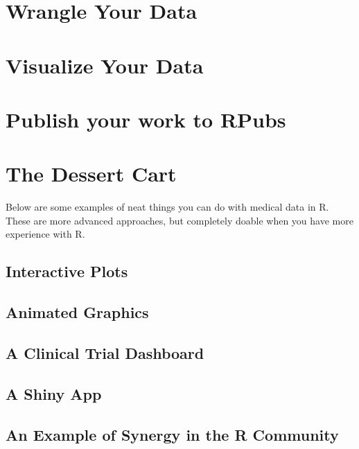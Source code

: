 \documentclass[]{book}
\begin{document}
\hypertarget{wrangle-your-data}{%
\section{Wrangle Your Data}\label{wrangle-your-data}}

\hypertarget{visualize-your-data}{%
\section{Visualize Your Data}\label{visualize-your-data}}

\hypertarget{publish-your-work-to-rpubs}{%
\section{Publish your work to RPubs}\label{publish-your-work-to-rpubs}}

\hypertarget{the-dessert-cart}{%
\section{The Dessert Cart}\label{the-dessert-cart}}

Below are some examples of neat things you can do with medical data in R. These are more advanced approaches, but completely doable when you have more experience with R.

\hypertarget{interactive-plots}{%
\subsection{Interactive Plots}\label{interactive-plots}}

\hypertarget{animated-graphics}{%
\subsection{Animated Graphics}\label{animated-graphics}}

\hypertarget{a-clinical-trial-dashboard}{%
\subsection{A Clinical Trial Dashboard}\label{a-clinical-trial-dashboard}}

\hypertarget{a-shiny-app}{%
\subsection{A Shiny App}\label{a-shiny-app}}

\hypertarget{an-example-of-synergy-in-the-r-community}{%
\subsection{An Example of Synergy in the R Community}\label{an-example-of-synergy-in-the-r-community}}
\end{document}
